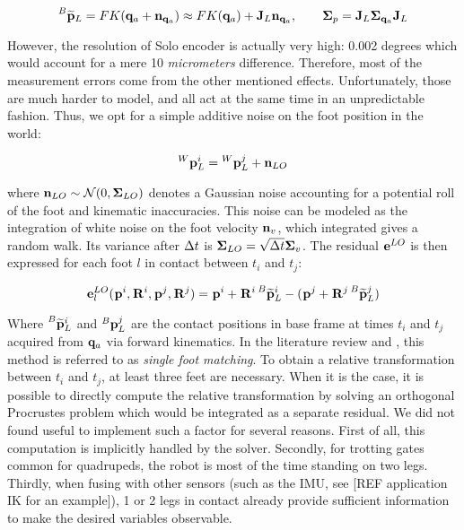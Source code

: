 \begin{equation}
    \prescript{B}{}{\widetilde{{\bf p}}}_{L} = FK({\bf q}_a + {\bf n}_{{\bf q}_a}) \approx FK({\bf q}_a) + {\bf J}_L{\bf n}_{{\bf q}_a}, \quad \quad {\bm \Sigma}_{p} = {\bf J}_L {\bm \Sigma}_{{\bf q}_a} {\bf J}_L
\end{equation}

However, the resolution of Solo encoder is actually very high: 0.002 degrees which would account for a mere 10 \textit{micrometers} difference.
Therefore, most of the measurement errors come from the other mentioned effects. Unfortunately, those are much harder to model, and all act at the same time
in an unpredictable fashion. Thus, we opt for a simple additive noise on the foot position in the world:

\begin{equation}
    \prescript{W}{}{{\bf p}}_{L}^i = \prescript{W}{}{{\bf p}}_{L}^j + {\bf n}_{LO}
\end{equation}

where ${\bf n}_{LO} \sim \mathcal{N}({0},{{\bm \Sigma}_{LO}})$ denotes a Gaussian noise accounting for a potential roll of the foot and kinematic inaccuracies.
This noise can be modeled as the integration of white noise on the foot velocity ${\bf n}_v$, which integrated gives a random walk.  
Its variance after $\Delta t$ is ${\bm \Sigma}_{LO} = \sqrt{\Delta t} {\bm \Sigma}_v$.
The residual ${\bf e}^{LO}$ is then expressed for each foot $l$ in contact between $t_i$ and $t_j$:

\begin{equation}
    {\bf e}^{LO}_l(\prescript{}{}{{\bf p}}_{}^i, \prescript{}{}{{\bf R}}_{}^i, \prescript{}{}{{\bf p}}_{}^j, \prescript{}{}{{\bf R}}_{}^j) = \prescript{}{}{{\bf p}}_{}^i + \prescript{}{}{{\bf R}}_{}^i \prescript{B}{}{\widetilde{{\bf p}}}_{L}^i - (\prescript{}{}{{\bf p}}_{}^j + \prescript{}{}{{\bf R}}_{}^j \prescript{B}{}{\widetilde{{\bf p}}}_{L}^j)
\end{equation}

Where $\prescript{B}{}{\widetilde{{\bf p}}}_{L}^i$ and $\prescript{B}{}{{\bf p}}_{L}^j$ are the contact positions in base frame at times $t_i$ and $t_j$ acquired from ${\bf q}_a$ via forward kinematics. 
In the literature review and , this method is referred to as \textit{single foot matching}. To obtain
a relative transformation between $t_i$ and $t_j$, at least three feet are necessary. When it is the case, it is possible to directly compute the
relative transformation by solving an orthogonal Procrustes problem \cite{roston1991dead} which would be integrated as a separate residual.
We did not found useful to implement such a factor for several reasons. First of all, this computation is implicitly handled by the solver.
Secondly, for trotting gates common for quadrupeds, the robot is most of the time standing on two legs. Thirdly, when fusing with other sensors (such as the IMU,
see [REF application IK for an example]), 1 or 2 legs in contact already provide sufficient information to make the desired variables observable.

